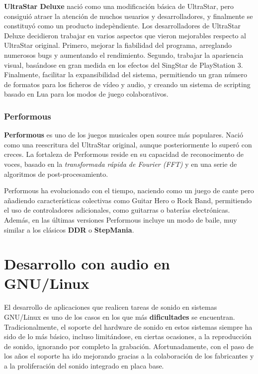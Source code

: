 \textbf{UltraStar Deluxe} nació como una modificación básica de UltraStar, pero
consiguió atraer la atención de muchos usuarios y desarrolladores, y finalmente
se constituyó como un producto indepèndiente. Los desarrolladores de UltraStar
Deluxe decidieron trabajar en varios aspectos que vieron mejorables respecto al
UltraStar original. Primero, mejorar la fiabilidad del programa, arreglando
numerosos bugs y aumentando el rendimiento. Segundo, trabajar la apariencia
visual, basándose en gran medida en los efectos del SingStar de PlayStation
3. Finalmente, facilitar la expansibilidad del sistema, permitiendo un gran
número de formatos para los ficheros de vídeo y audio, y creando un sistema de
scripting basado en Lua para los modos de juego colaborativos.

\subsubsection{Performous}

\textbf{Performous} es uno de los juegos musicales open source más
populares. Nació como una reescritura del UltraStar original, aunque
posteriormente lo superó con creces. La fortaleza de Performous reside en su
capacidad de reconocimento de voces, basado en la \textit{transformada rápida de
  Fourier (FFT)} y en una serie de algoritmos de post-procesamiento. 

Performous ha evolucionado con el tiempo, naciendo como un juego de cante pero
añadiendo características colectivas como Guitar Hero o Rock Band, permitiendo
el uso de controladores adicionales, como guitarras o baterías
electrónicas. Además, en las últimas versiones Performous incluye un modo de
baile, muy similar a los clásicos \textbf{DDR} o \textbf{StepMania}.

\section{Desarrollo con audio en GNU/Linux}

El desarrollo de aplicaciones que realicen tareas de sonido en sistemas
GNU/Linux es uno de los casos en los que más \textbf{dificultades} se
encuentran. Tradicionalmente, el soporte del hardware de sonido en estos
sistemas siempre ha sido de lo más básico, incluso limitándose, en ciertas
ocasiones, a la reproducción de sonido, ignorando por completo la
grabación. Afortunadamente, con el paso de los años el soporte ha ido mejorando
gracias a la colaboración de los fabricantes y a la proliferación del sonido
integrado en placa base.

